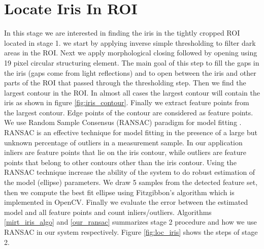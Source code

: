 \section{Locate Iris In ROI} 
In this stage we are interested in finding the iris in the tightly cropped ROI located in stage 1. we start by applying inverse simple thresholding to filter dark areas in the ROI. Next we apply morphological closing followed by opening using 19 pixel circular structuring element. The main goal of this step to fill the gaps in the iris (gaps come from light reflections) and to open between the iris and other parts of the ROI that passed through the thresholding step. Then we find the largest contour in the ROI. In almost all cases the largest contour will contain the iris as shown in figure \ref{fig:iris_contour}. Finally we extract feature points from the largest contour. Edge points of the contour are considered as feature points. We use Random Sample Consensus (RANSAC) paradigm for model fitting \cite{ransac}. RANSAC is an effective technique for model fitting in the presence of a large but unknown percentage of outliers in a measurement sample. In our application inliers are feature points that lie on the iris contour, while outliers are feature points that belong to other contours other than the iris contour. Using the RANSAC technique increase the ability of the system to do robust estimation of the model (ellipse) parameters. We draw 5 samples from the detected feature set, then we compute the best fit ellipse using Fitzgibbon’s algorithm \cite{fitzgibbon96} which is implemented in OpenCV. Finally we evaluate the error between the estimated model and all feature points and count inliers/outliers. Algorithms \ref{mirt_iris_algo} and \ref{our_ransac} summarizes stage 2 procedure and how we use RANSAC in our system respectively. Figure \ref{fig:loc_iris} shows the steps of stage 2. 



